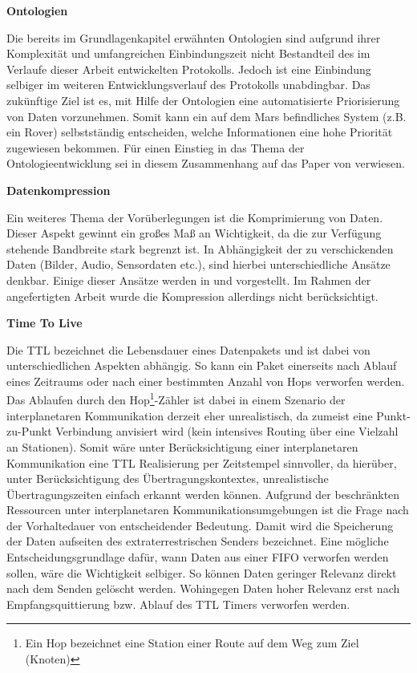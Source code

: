 \label{sec:Vorueberlegung}

\textbf{Ontologien}

Die bereits im Grundlagenkapitel erw{\"a}hnten Ontologien sind aufgrund ihrer
Komplexit{\"a}t und umfangreichen Einbindungszeit nicht Bestandteil des im
Verlaufe dieser Arbeit entwickelten Protokolls. Jedoch ist eine Einbindung
selbiger im weiteren Entwicklungsverlauf des Protokolls unabdingbar. Das
zuk{\"u}nftige Ziel ist es, mit Hilfe der Ontologien eine automatisierte
Priorisierung von Daten vorzunehmen. Somit kann ein auf dem Mars befindliches
System (z.B. ein Rover) selbstst{\"a}ndig entscheiden, welche Informationen eine
hohe Priorit{\"a}t zugewiesen bekommen. F{\"u}r einen Einstieg in das Thema der
Ontologieentwicklung sei in diesem Zusammenhang auf das Paper von \cite{Noy2000}
verwiesen.

\textbf{Datenkompression}

Ein weiteres Thema der Vor{\"u}berlegungen ist die Komprimierung von Daten.
Dieser Aspekt gewinnt ein gro{\ss}es Ma{\ss} an Wichtigkeit, da die zur
Verf{\"u}gung stehende Bandbreite stark begrenzt ist. In Abh{\"a}ngigkeit der zu
verschickenden Daten (Bilder, Audio, Sensordaten etc.), sind hierbei
unterschiedliche Ans{\"a}tze denkbar. Einige dieser Ans{\"a}tze werden in
\cite{Kiely2006} und \cite{Kiely2007} vorgestellt. Im Rahmen der angefertigten
Arbeit wurde die Kompression allerdings nicht ber{\"u}cksichtigt.

\textbf{Time To Live}

Die \gls{TTL} bezeichnet die Lebensdauer eines Datenpakets und ist
dabei von unterschiedlichen Aspekten abh{\"a}ngig. So kann ein Paket einerseits nach
Ablauf eines Zeitraums oder nach einer bestimmten Anzahl
von Hops verworfen werden. Das Ablaufen durch den Hop\footnote{Ein Hop
bezeichnet eine Station einer Route auf dem Weg zum Ziel (Knoten)}-Zähler
ist dabei in einem Szenario der interplanetaren Kommunikation derzeit eher
unrealistisch, da zumeist eine Punkt-zu-Punkt Verbindung anvisiert wird (kein
intensives Routing {\"u}ber eine Vielzahl an Stationen). Somit w{\"a}re unter
Ber{\"u}cksichtigung einer interplanetaren Kommunikation eine \gls{TTL} Realisierung
per Zeitstempel sinnvoller, da hier{\"u}ber, unter Ber{\"u}cksichtigung des
{\"U}bertragungskontextes, unrealistische {\"U}bertragungszeiten einfach erkannt
werden k{\"o}nnen.
Aufgrund der beschr{\"a}nkten Ressourcen unter interplanetaren
Kommunikationsumgebungen ist die Frage nach der Vorhaltedauer von
entscheidender Bedeutung. Damit wird die Speicherung der
Daten aufseiten des extraterrestrischen Senders bezeichnet. 
Eine m{\"o}gliche Entscheidungsgrundlage daf{\"u}r, wann Daten aus einer
\gls{FIFO} verworfen werden sollen, w{\"a}re die Wichtigkeit selbiger. So
k{\"o}nnen Daten geringer Relevanz direkt nach dem Senden gel{\"o}scht werden.
Wohingegen Daten hoher Relevanz erst nach Empfangsquittierung bzw. Ablauf des
\gls{TTL} Timers verworfen werden.

